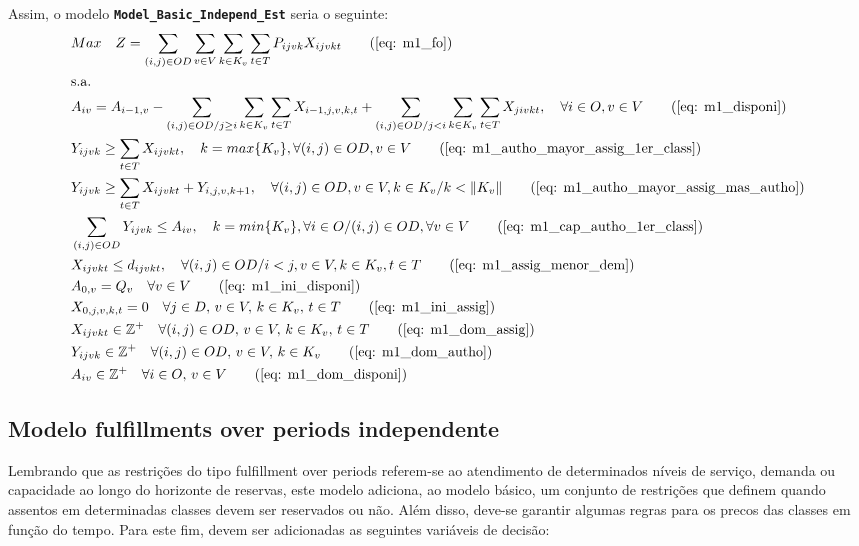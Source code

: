 Assim, o modelo \textbf{ \texttt{Model\_Basic\_Independ\_Est}} seria o seguinte:
\allowdisplaybreaks
\begin{align}
	& Max \quad Z = \sum_{(i,j)\in OD} \sum_{v\in V} \sum_{k\in K_v} \sum_{t\in T} P_{ijvk} X_{ijvkt}     \tag{\ref{eq: m1_fo}}   \\
	& \text{s.a.}  \notag \\
	& A_{iv} = A_{i-1,v} - \sum_{(i,j) \in OD/j \geq i} \sum_{k\in K_v}\sum_{t\in T}X_{i-1,j,v,k,t} + \sum_{(i,j) \in OD/j<i} \sum_{k\in K_v}\sum_{t\in T}X_{jivkt}, \quad \forall i \in O, v \in V   \tag{\ref{eq: m1_disponi}} \\
	& Y_{ijvk} \geq  \sum_{t \in T} X_{ijvkt},  \quad k = max\{K_v\}, \forall(i,j) \in OD ,v \in V     \tag{\ref{eq: m1_autho_mayor_assig_1er_class}} \\
	& Y_{ijvk} \geq  \sum_{t \in T} X_{ijvkt} + Y_{i,j,v,k + 1} , \quad \forall(i,j) \in OD, v \in V, k \in K_v / k < \lVert K_v \rVert   \tag{\ref{eq: m1_autho_mayor_assig_mas_autho}} \\
	& \sum_{(i,j) \in OD} Y_{ijvk} \leq A_{iv}, \quad  k = min\{K_v\}, \forall i \in O / (i,j) \in OD,   \forall v \in V       \tag{\ref{eq: m1_cap_autho_1er_class}} \\
	& X_{ijvkt} \leq d_{ijvkt},  \quad \forall (i,j) \in OD / i < j  ,v \in V, k \in K_v, t\in T   \tag{\ref{eq: m1_assig_menor_dem}} \\
	& A_{0,v} = Q_v \quad \forall v \in V  \tag{\ref{eq: m1_ini_disponi}} \\ 
	& X_{0,j,v,k,t} = 0 \quad \forall j \in D,\, v \in V,\, k \in K_v,\, t \in T  \tag{\ref{eq: m1_ini_assig}} \\ 
	& X_{ijvkt} \in \mathbb{Z}^+ \quad \forall(i,j) \in OD,\, v \in V,\, k \in K_v,\, t \in T  \tag{\ref{eq: m1_dom_assig}} \\ 
	& Y_{ijvk} \in \mathbb{Z}^+ \quad \forall(i,j) \in OD,\, v \in V,\, k \in K_v  \tag{\ref{eq: m1_dom_autho}} \\ 
	& A_{iv} \in \mathbb{Z}^+ \quad \forall i \in O,\, v \in V  \tag{\ref{eq: m1_dom_disponi}} 
\end{align}

\subsection{Modelo fulfillments over periods independente}
Lembrando que as restrições do tipo fulfillment over periods referem-se ao atendimento de determinados níveis de serviço, demanda ou capacidade ao longo do horizonte de reservas, este modelo adiciona, ao modelo básico, um conjunto de restrições que definem quando assentos em determinadas classes devem ser reservados ou não. Além disso, 
deve-se garantir algumas regras para os precos das classes em função do tempo. Para este fim, devem ser adicionadas as seguintes variáveis de decisão:

